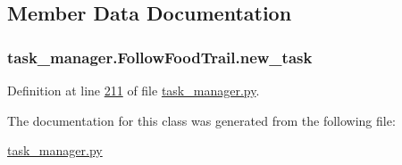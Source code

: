 \subsection{Member Data Documentation}
\hypertarget{classtask__manager_1_1FollowFoodTrail_aefc8c49492622a4e4fa61279fd52ed12}{
\subsubsection[{new\+\_\+task}]{\setlength{\rightskip}{0pt plus 5cm}task\+\_\+manager.\+Follow\+Food\+Trail.\+new\+\_\+task}}\label{classtask__manager_1_1FollowFoodTrail_aefc8c49492622a4e4fa61279fd52ed12}


Definition at line \hyperlink{task__manager_8py_source_l00211}{211} of file \hyperlink{task__manager_8py_source}{task\+\_\+manager.\+py}.



The documentation for this class was generated from the following file\+:\begin{DoxyCompactItemize}
\item 
\hyperlink{task__manager_8py}{task\+\_\+manager.\+py}\end{DoxyCompactItemize}
